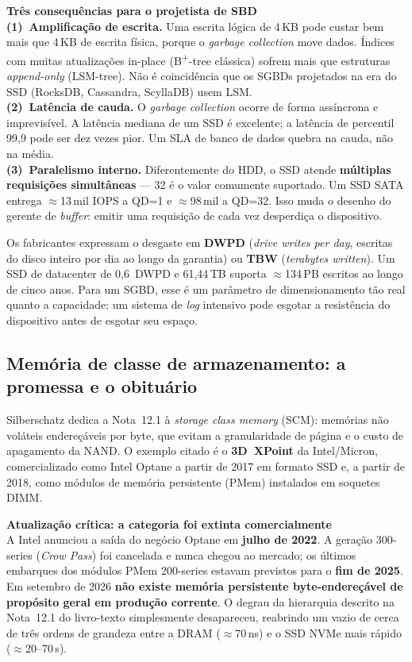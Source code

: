 \documentclass[11pt,a4paper]{article}
\newcommand{\destaque}[2]{%
  \begin{center}\begin{minipage}{0.96\textwidth}
  \colorbox{fundo}{\begin{minipage}{\dimexpr\linewidth-2\fboxsep}
  \vspace{3pt}\textbf{\color{azul}#1}\\[2pt]\small #2\vspace{4pt}
  \end{minipage}}\end{minipage}\end{center}}
\newcommand{\correcao}[2]{%
  \begin{center}\begin{minipage}{0.96\textwidth}
  \colorbox{fundo}{\begin{minipage}{\dimexpr\linewidth-2\fboxsep}
  \vspace{3pt}\textbf{\color{laranja}#1}\\[2pt]\small #2\vspace{4pt}
  \end{minipage}}\end{minipage}\end{center}}
\begin{document}
\destaque{Três consequências para o projetista de SBD}{%
\textbf{(1)~Amplificação de escrita.} Uma escrita lógica de 4\,KB pode custar bem mais que
4\,KB de escrita física, porque o \emph{garbage collection} move dados. Índices com muitas
atualizações in-place (B\textsuperscript{+}-tree clássica) sofrem mais que estruturas
\emph{append-only} (LSM-tree). Não é coincidência que os SGBDs projetados na era do SSD
(RocksDB, Cassandra, ScyllaDB) usem LSM.\\[3pt]
\textbf{(2)~Latência de cauda.} O \emph{garbage collection} ocorre de forma assíncrona e
imprevisível. A latência mediana de um SSD é excelente; a latência de percentil 99,9 pode
ser dez vezes pior. Um SLA de banco de dados quebra na cauda, não na média.\\[3pt]
\textbf{(3)~Paralelismo interno.} Diferentemente do HDD, o SSD atende \textbf{múltiplas
requisições simultâneas} --- 32 é o valor comumente suportado. Um SSD SATA entrega
$\approx$13\,mil IOPS a QD=1 e $\approx$98\,mil a QD=32. Isso muda o desenho do gerente de
\emph{buffer}: emitir uma requisição de cada vez desperdiça o dispositivo.}

Os fabricantes expressam o desgaste em \textbf{DWPD} (\emph{drive writes per day}, escritas
do disco inteiro por dia ao longo da garantia) ou \textbf{TBW} (\emph{terabytes written}).
Um SSD de datacenter de 0,6~DWPD e 61,44\,TB suporta $\approx$134\,PB escritos ao longo de
cinco anos. Para um SGBD, esse é um parâmetro de dimensionamento tão real quanto a
capacidade: um sistema de \emph{log} intensivo pode esgotar a resistência do dispositivo
antes de esgotar seu espaço.

\subsection{Memória de classe de armazenamento: a promessa e o obituário}

Silberschatz dedica a Nota~12.1 à \emph{storage class memory} (SCM): memórias não voláteis
endereçáveis por byte, que evitam a granularidade de página e o custo de apagamento da NAND.
O exemplo citado é o \textbf{3D~XPoint} da Intel/Micron, comercializado como Intel Optane a
partir de 2017 em formato SSD e, a partir de 2018, como módulos de memória persistente
(PMem) instalados em soquetes DIMM.

\correcao{Atualização crítica: a categoria foi extinta comercialmente}{%
A Intel anunciou a saída do negócio Optane em \textbf{julho de 2022}. A geração 300-series
(\emph{Crow Pass}) foi cancelada e nunca chegou ao mercado; os últimos embarques dos
módulos PMem 200-series estavam previstos para o \textbf{fim de 2025}. Em setembro de 2026
\textbf{não existe memória persistente byte-endereçável de propósito geral em produção
corrente}. O degrau da hierarquia descrito na Nota~12.1 do livro-texto simplesmente
desapareceu, reabrindo um vazio de cerca de três ordens de grandeza entre a DRAM
($\approx$70\,ns) e o SSD NVMe mais rápido ($\approx$20--70\,\textmu s).}
\end{document}
